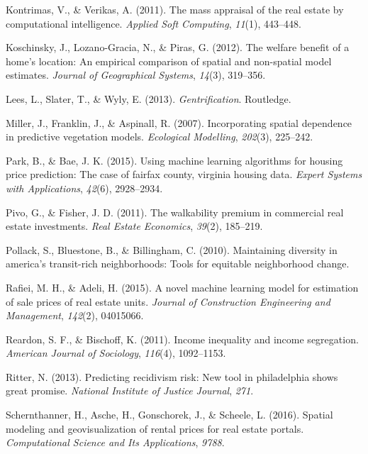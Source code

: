 \documentclass[12pt,]{article}
\begin{document}
\leavevmode\hypertarget{ref-Kontrimasa2011}{}%
Kontrimas, V., \& Verikas, A. (2011). The mass appraisal of the real
estate by computational intelligence. \emph{Applied Soft Computing},
\emph{11}(1), 443--448.

\leavevmode\hypertarget{ref-Koschinsky2012}{}%
Koschinsky, J., Lozano-Gracia, N., \& Piras, G. (2012). The welfare
benefit of a home's location: An empirical comparison of spatial and
non-spatial model estimates. \emph{Journal of Geographical Systems},
\emph{14}(3), 319--356.

\leavevmode\hypertarget{ref-Lees2008}{}%
Lees, L., Slater, T., \& Wyly, E. (2013). \emph{Gentrification}.
Routledge.

\leavevmode\hypertarget{ref-Miller2015}{}%
Miller, J., Franklin, J., \& Aspinall, R. (2007). Incorporating spatial
dependence in predictive vegetation models. \emph{Ecological Modelling},
\emph{202}(3), 225--242.

\leavevmode\hypertarget{ref-Park2015}{}%
Park, B., \& Bae, J. K. (2015). Using machine learning algorithms for
housing price prediction: The case of fairfax county, virginia housing
data. \emph{Expert Systems with Applications}, \emph{42}(6), 2928--2934.

\leavevmode\hypertarget{ref-Pivo2011}{}%
Pivo, G., \& Fisher, J. D. (2011). The walkability premium in commercial
real estate investments. \emph{Real Estate Economics}, \emph{39}(2),
185--219.

\leavevmode\hypertarget{ref-Pollack2010}{}%
Pollack, S., Bluestone, B., \& Billingham, C. (2010). Maintaining
diversity in america's transit-rich neighborhoods: Tools for equitable
neighborhood change.

\leavevmode\hypertarget{ref-Rafiei2016}{}%
Rafiei, M. H., \& Adeli, H. (2015). A novel machine learning model for
estimation of sale prices of real estate units. \emph{Journal of
Construction Engineering and Management}, \emph{142}(2), 04015066.

\leavevmode\hypertarget{ref-Reardon2011}{}%
Reardon, S. F., \& Bischoff, K. (2011). Income inequality and income
segregation. \emph{American Journal of Sociology}, \emph{116}(4),
1092--1153.

\leavevmode\hypertarget{ref-Ritter2013}{}%
Ritter, N. (2013). Predicting recidivism risk: New tool in philadelphia
shows great promise. \emph{National Institute of Justice Journal},
\emph{271}.

\leavevmode\hypertarget{ref-Schernthanner2016}{}%
Schernthanner, H., Asche, H., Gonschorek, J., \& Scheele, L. (2016).
Spatial modeling and geovisualization of rental prices for real estate
portals. \emph{Computational Science and Its Applications}, \emph{9788}.
\end{document}
